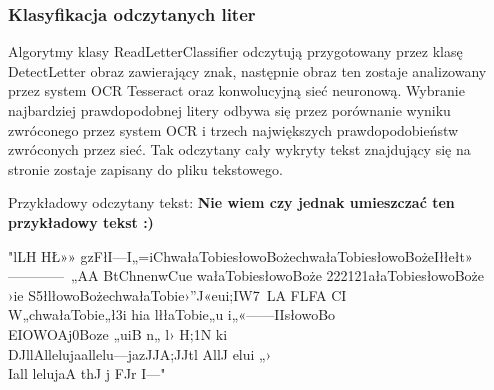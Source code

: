 \documentclass[a4paper,12pt]{article}
\newcommand\spacingIndent{2.2em}
\begin{document}
        \subsubsection{Klasyfikacja odczytanych liter}
	        \hspace{\spacingIndent} Algorytmy klasy ReadLetterClassifier odczytują przygotowany     przez klasę DetectLetter obraz zawierający znak, następnie obraz ten zostaje analizowany przez system OCR Tesseract oraz konwolucyjną sieć       neuronową. Wybranie najbardziej prawdopodobnej litery odbywa się przez      porównanie wyniku zwróconego przez system OCR i trzech największych         prawdopodobieństw zwróconych przez sieć. Tak odczytany cały wykryty         tekst znajdujący się na stronie zostaje zapisany do pliku tekstowego.
	        
	            Przykładowy odczytany tekst: \textbf{Nie wiem czy jednak umieszczać ten przykładowy tekst :)}
	        
	         "lLH HŁ»» gzFłI—I„=iChwałaTobiesłowoBożechwałaTobiesłowoBożeIłłełt»\\
	         ————~„AA    BtChnenwCue    wałaTobiesłowoBoże 222121ałaTobiesłowoBoże\\
	         ›ie   S5łlłowoBożechwałaTobie›”J«eui;IW7~LA   FLFA   CI\\   W„chwałaTobie„ł3i  hia      lłłaTobie„u    i„«——IIsłowoBo\\ EIOWOAj0Boze „uiB  n„   l›    H;1N ki\\ DJllAllelujaallelu—jazJJA;JJtl   AllJ      elui       „›\\ 
	         Iall lelujaA  thJ     j FJr      I—"  
	        
	        
	        
\end{document}

